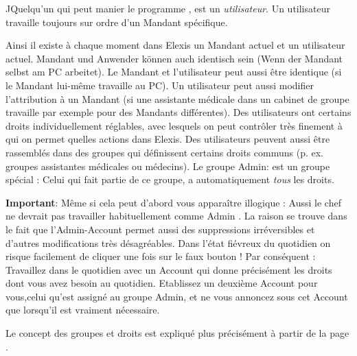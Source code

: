 \medskip

JQuelqu'un qui peut manier le programme , est un \textit{utilisateur}. Un utilisateur travaille toujours sur ordre d'un Mandant spécifique.

Ainsi il existe à chaque moment dans Elexis un Mandant actuel et un utilisateur actuel.
Mandant und Anwender können auch identisch sein (Wenn der
Mandant selbst am PC arbeitet).
Le Mandant et l'utilisateur peut aussi être identique (si le Mandant lui-même travaille au PC). Un utilisateur peut aussi modifier l'attribution à un Mandant (si une assistante médicale dans un cabinet de groupe travaille par exemple pour des Mandants différentes).
Des utilisateurs ont certains droits individuellement réglables, avec lesquels on peut contrôler très finement à qui on permet quelles actions dans Elexis. Des utilisateurs peuvent aussi être rassemblés dans des groupes qui définissent certains droits communs (p. ex. groupes  \glqq assistantes médicales\grqq{} ou \glqq médecins\grqq{}). Le groupe \glqq Admin\grqq{}: est un groupe spécial : Celui qui fait partie de ce groupe, a automatiquement  \textit{tous} les droits.

\medskip

\textbf{Important}: Même si cela peut d'abord vous apparaître illogique : Aussi le chef ne devrait pas travailler habituellement comme Admin .
La raison se trouve dans le fait que l'Admin-Account permet aussi des suppressions irréversibles et d'autres modifications très désagréables. Dans l'état fiévreux du quotidien on risque facilement de cliquer une fois sur le faux bouton !
Par conséquent : Travaillez dans le quotidien avec un Account qui donne précisément les droits dont vous avez besoin au quotidien. Etablissez un deuxième Account pour vous,celui qu'est assigné au groupe Admin, et ne vous annoncez sous cet Account que lorsqu'il est vraiment nécessaire.

Le concept des groupes et droits est expliqué plus précisément à partir de la page\pageref{sec:gruppen} .


